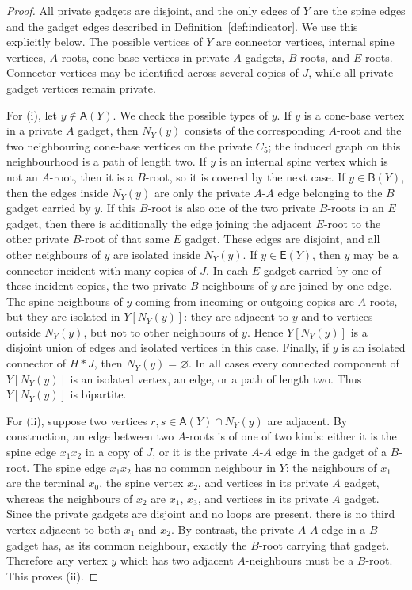 \documentclass[11pt]{amsart}
\theoremstyle{plain}
\theoremstyle{definition}
\newcommand{\Aset}{\mathsf A}
\newcommand{\Bset}{\mathsf B}
\newcommand{\Eset}{\mathsf E}
\begin{document}
\begin{proof}
All private gadgets are disjoint, and the only edges of $Y$ are the spine edges and the gadget edges described in Definition~\ref{def:indicator}.  We use this explicitly below.  The possible vertices of $Y$ are connector vertices, internal spine vertices, $A$-roots, cone-base vertices in private $A$ gadgets, $B$-roots, and $E$-roots.  Connector vertices may be identified across several copies of $J$, while all private gadget vertices remain private.

For (i), let $y\notin\Aset(Y)$.  We check the possible types of $y$.  If $y$ is a cone-base vertex in a private $A$ gadget, then $N_Y(y)$ consists of the corresponding $A$-root and the two neighbouring cone-base vertices on the private $C_5$; the induced graph on this neighbourhood is a path of length two.
If $y$ is an internal spine vertex which is not an $A$-root, then it is a $B$-root, so it is covered by the next case.  If $y\in\Bset(Y)$, then the edges inside $N_Y(y)$ are only the private $A$-$A$ edge belonging to the $B$ gadget carried by $y$.  If this $B$-root is also one of the two private $B$-roots in an $E$ gadget, then there is additionally the edge joining the adjacent $E$-root to the other private $B$-root of that same $E$ gadget.  These edges are disjoint, and all other neighbours of $y$ are isolated inside $N_Y(y)$.
If $y\in\Eset(Y)$, then $y$ may be a connector incident with many copies of $J$.  In each $E$ gadget carried by one of these incident copies, the two private $B$-neighbours of $y$ are joined by one edge.  The spine neighbours of $y$ coming from incoming or outgoing copies are $A$-roots, but they are isolated in $Y[N_Y(y)]$: they are adjacent to $y$ and to vertices outside $N_Y(y)$, but not to other neighbours of $y$.  Hence $Y[N_Y(y)]$ is a disjoint union of edges and isolated vertices in this case.
Finally, if $y$ is an isolated connector of $H*J$, then $N_Y(y)=\varnothing$.
In all cases every connected component of $Y[N_Y(y)]$ is an isolated vertex, an edge, or a path of length two.  Thus $Y[N_Y(y)]$ is bipartite.

For (ii), suppose two vertices $r,s\in\Aset(Y)\cap N_Y(y)$ are adjacent.  By construction, an edge between two $A$-roots is of one of two kinds: either it is the spine edge $x_1x_2$ in a copy of $J$, or it is the private $A$-$A$ edge in the gadget of a $B$-root.  The spine edge $x_1x_2$ has no common neighbour in $Y$: the neighbours of $x_1$ are the terminal $x_0$, the spine vertex $x_2$, and vertices in its private $A$ gadget, whereas the neighbours of $x_2$ are $x_1$, $x_3$, and vertices in its private $A$ gadget.  Since the private gadgets are disjoint and no loops are present, there is no third vertex adjacent to both $x_1$ and $x_2$.  By contrast, the private $A$-$A$ edge in a $B$ gadget has, as its common neighbour, exactly the $B$-root carrying that gadget.  Therefore any vertex $y$ which has two adjacent $A$-neighbours must be a $B$-root.  This proves (ii).


\end{proof}
\end{document}
